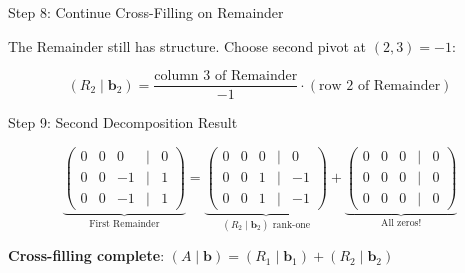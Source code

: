 \documentclass[10pt]{beamer}
\theoremstyle{definition}
\newcommand{\x}[1]{\alert{\textbf{#1}}}
\begin{document}
\begin{frame}[fragile]{Step 8: Continue Cross-Filling on Remainder}

The Remainder still has structure. Choose second pivot at $(2,3) = -1$:

\begin{center}
\end{center}

\vspace{0.5em}

$$(R_2 \mid \mathbf{b}_2) = \frac{\text{column 3 of Remainder}}{-1} \cdot (\text{row 2 of Remainder})$$

\end{frame}

\begin{frame}[fragile]{Step 9: Second Decomposition Result}

$$\underbrace{\begin{pmatrix}
0 & 0 & 0 & | & 0 \\
0 & 0 & -1 & | & 1 \\
0 & 0 & -1 & | & 1
\end{pmatrix}}_{\text{First Remainder}} = \underbrace{\begin{pmatrix}
0 & 0 & 0 & | & 0 \\
0 & 0 & 1 & | & -1 \\
0 & 0 & 1 & | & -1
\end{pmatrix}}_{(R_2 \mid \mathbf{b}_2) \text{ rank-one}} + \underbrace{\begin{pmatrix}
0 & 0 & 0 & | & 0 \\
0 & 0 & 0 & | & 0 \\
0 & 0 & 0 & | & 0
\end{pmatrix}}_{\text{All zeros!}}$$

\vspace{1em}

\x{Cross-filling complete}: $(A \mid \mathbf{b}) = (R_1 \mid \mathbf{b}_1) + (R_2 \mid \mathbf{b}_2)$

\end{frame}
\end{document}
